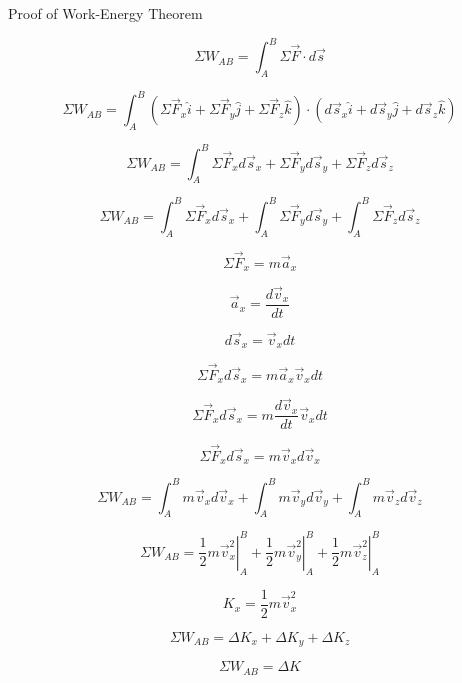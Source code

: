 \documentclass[12pt,letterpaper]{article}
\begin{document}
Proof of Work-Energy Theorem

$$ \Sigma W_{AB} = \int_{A}^{B} \Sigma \vec{F}  \cdot d\vec{s}$$

$$ \Sigma W_{AB} = \int_{A}^{B} (\Sigma \vec{F}_x \hat{i} + \Sigma \vec{F}_y \hat{j} + \Sigma \vec{F}_z \hat{k})  \cdot (d\vec{s}_x \hat{i} + d\vec{s}_y \hat{j} + d\vec{s}_z \hat{k})$$

$$ \Sigma W_{AB} = \int_{A}^{B} \Sigma \vec{F}_x d\vec{s}_x  + \Sigma \vec{F}_y d\vec{s}_y + \Sigma \vec{F}_z d\vec{s}_z$$

$$ \Sigma W_{AB} = \int_{A}^{B} \Sigma \vec{F}_x d\vec{s}_x + \int_{A}^{B} \Sigma \vec{F}_y d\vec{s}_y + \int_{A}^{B} \Sigma \vec{F}_z d\vec{s}_z $$

$$\Sigma \vec{F}_x = m\vec{a}_x $$

$$\vec{a}_x = \dfrac{d\vec{v}_x}{dt} $$

$$d\vec{s}_x = \vec{v}_x dt $$

$$\Sigma \vec{F}_x d\vec{s}_x =  m\vec{a}_x  \vec{v}_x dt $$

$$\Sigma \vec{F}_x d\vec{s}_x = m \dfrac{d\vec{v}_x}{dt}  \vec{v}_x dt $$

$$\Sigma \vec{F}_x d\vec{s}_x = m  \vec{v}_x  d\vec{v}_x $$


$$ \Sigma W_{AB} = \int_{A}^{B} m  \vec{v}_x  d\vec{v}_x + \int_{A}^{B} m  \vec{v}_y  d\vec{v}_y + \int_{A}^{B} m  \vec{v}_z  d\vec{v}_z $$

$$ \Sigma W_{AB} = \left .  \frac{1}{2}m\vec{v}_x^2 \right|_{A}^{B} + \left .  \frac{1}{2}m\vec{v}_y^2 \right|_{A}^{B} + \left .  \frac{1}{2}m\vec{v}_z^2 \right|_{A}^{B}$$

$$K_x = \frac{1}{2}m\vec{v}_x^2$$

$$ \Sigma W_{AB} = \Delta K_x + \Delta K_y + \Delta K_z$$

$$ \Sigma W_{AB} = \Delta K$$
\end{document}
